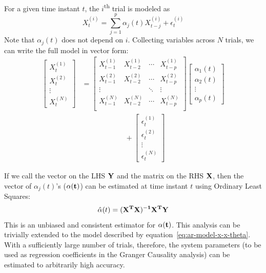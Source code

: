 \documentclass[letterpaper, 10pt, conference]{ieeeconf}
\begin{document}
For a given time instant $t$, the $i$\textsuperscript{th} trial is modeled as
\begin{equation*}
	X_t^{(i)} = \sum_{j=1}^p \alpha_j(t) X_{t-j}^{(i)} + \epsilon_t^{(i)}
\end{equation*}
Note that $\alpha_j(t)$ does not depend on $i$. Collecting variables across $N$ trials, we can write the full model in vector form:
\begin{align*}
	\left[ \begin{array}{c}
			X_t^{(1)} \\
			X_t^{(2)} \\
			\vdots \\
			X_t^{(N)}
	\end{array} \right]
	&=
	\left[ \begin{array}{cccc}
			X_{t-1}^{(1)} & X_{t-2}^{(1)} & \cdots & X_{t-p}^{(1)} \\
			X_{t-1}^{(2)} & X_{t-2}^{(2)} & \cdots & X_{t-p}^{(2)} \\
			\vdots &  & \ddots & \vdots \\
			X_{t-1}^{(N)} & X_{t-2}^{(N)} & \cdots & X_{t-p}^{(N)} \\
	\end{array} \right]
	\left[ \begin{array}{c}
			\alpha_1(t) \\
			\alpha_2(t) \\
			\vdots \\
			\alpha_p(t)
	\end{array} \right] \\
	&\qquad \qquad \qquad +
	\left[ \begin{array}{c}
			\epsilon_t^{(1)} \\
			\epsilon_t^{(2)} \\
			\vdots \\
			\epsilon_t^{(N)}
	\end{array} \right]
\end{align*}

If we call the vector on the LHS $\bf{Y}$ and the matrix on the RHS $\bf{X}$, then the vector of $\alpha_j(t)$'s ($\bf{\alpha}(t)$) can be estimated at time instant $t$ using Ordinary Least Squares:
\begin{equation*}
\hat{\bf{\alpha}}(t) = (\bf{X}^T \bf{X})^{-1} \bf{X}^T \bf{Y}
\end{equation*}
This is an unbiased and consistent estimator for $\bf{\alpha}(t)$. This analysis can be trivially extended to the model described by equation~\ref{eq:ar-model-x-x-theta}. With a sufficiently large number of trials, therefore, the system parameters (to be used as regression coefficients in the Granger Causality analysis) can be estimated to arbitrarily high accuracy.
\end{document}
